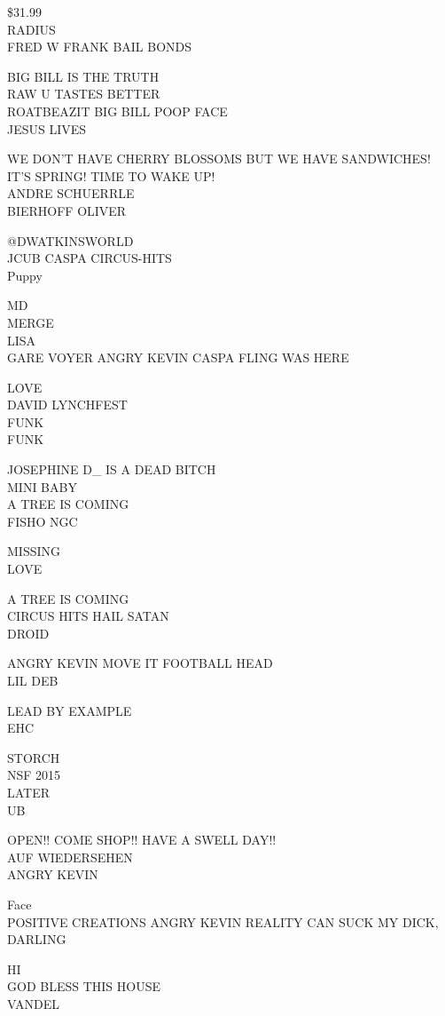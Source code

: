 \documentclass[10pt,letterpaper]{article}
\begin{document}
\$31.99\\
RADIUS\\
FRED W FRANK BAIL BONDS

BIG BILL IS THE TRUTH\\
RAW U TASTES BETTER\\
ROATBEAZIT BIG BILL POOP FACE\\
JESUS LIVES

WE DON'T HAVE CHERRY BLOSSOMS BUT WE HAVE SANDWICHES!\\
IT'S SPRING! TIME TO WAKE UP!\\
ANDRE SCHUERRLE\\
BIERHOFF OLIVER

@DWATKINSWORLD\\
JCUB CASPA CIRCUS{-}HITS\\
Puppy

MD\\
MERGE\\
LISA\\
GARE VOYER ANGRY KEVIN CASPA FLING WAS HERE

LOVE\\
DAVID LYNCHFEST\\
FUNK\\
FUNK

JOSEPHINE D\_ IS A DEAD BITCH\\
MINI BABY\\
A TREE IS COMING\\
FISHO NGC

MISSING\\
LOVE

A TREE IS COMING\\
CIRCUS HITS HAIL SATAN\\
DROID

ANGRY KEVIN MOVE IT FOOTBALL HEAD\\
LIL DEB

LEAD BY EXAMPLE\\
EHC

STORCH\\
NSF 2015\\
LATER\\
UB

OPEN!! COME SHOP!! HAVE A SWELL DAY!!\\
AUF WIEDERSEHEN\\
ANGRY KEVIN

Face\\
POSITIVE CREATIONS ANGRY KEVIN REALITY CAN SUCK MY DICK, DARLING

HI\\
GOD BLESS THIS HOUSE\\
VANDEL
\end{document}
